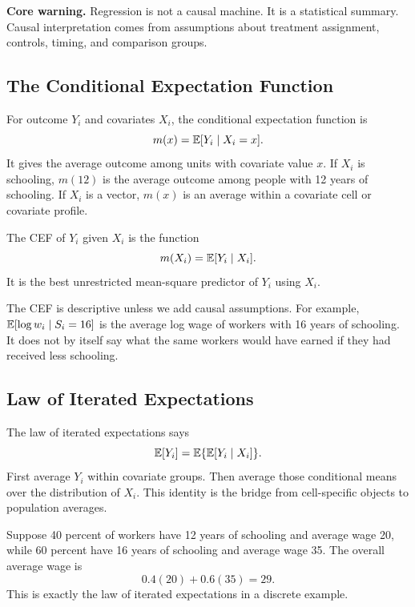 \begin{boxF}
\textbf{Core warning.} Regression is not a causal machine. It is a statistical
summary. Causal interpretation comes from assumptions about treatment assignment,
controls, timing, and comparison groups.
\end{boxF}

\subsection{The Conditional Expectation Function}

For outcome \(Y_i\) and covariates \(X_i\), the conditional expectation function
is
\[
    m(x)=\mathbb{E}[Y_i\mid X_i=x].
\]
It gives the average outcome among units with covariate value \(x\). If \(X_i\)
is schooling, \(m(12)\) is the average outcome among people with 12 years of
schooling. If \(X_i\) is a vector, \(m(x)\) is an average within a covariate
cell or covariate profile.

\begin{defN}
The CEF of \(Y_i\) given \(X_i\) is the function
\[
    m(X_i)=\mathbb{E}[Y_i\mid X_i].
\]
It is the best unrestricted mean-square predictor of \(Y_i\) using \(X_i\).
\end{defN}

The CEF is descriptive unless we add causal assumptions. For example,
\(\mathbb{E}[\log w_i\mid S_i=16]\) is the average log wage of workers with 16 years of
schooling. It does not by itself say what the same workers would have earned if
they had received less schooling.

\subsection{Law of Iterated Expectations}

The law of iterated expectations says
\[
    \mathbb{E}[Y_i]=\mathbb{E}\{\mathbb{E}[Y_i\mid X_i]\}.
\]
First average \(Y_i\) within covariate groups. Then average those conditional
means over the distribution of \(X_i\). This identity is the bridge from
cell-specific objects to population averages.

\begin{exmp}
Suppose 40 percent of workers have 12 years of schooling and average wage 20,
while 60 percent have 16 years of schooling and average wage 35. The overall
average wage is
\[
    0.4(20)+0.6(35)=29.
\]
This is exactly the law of iterated expectations in a discrete example.
\end{exmp}

